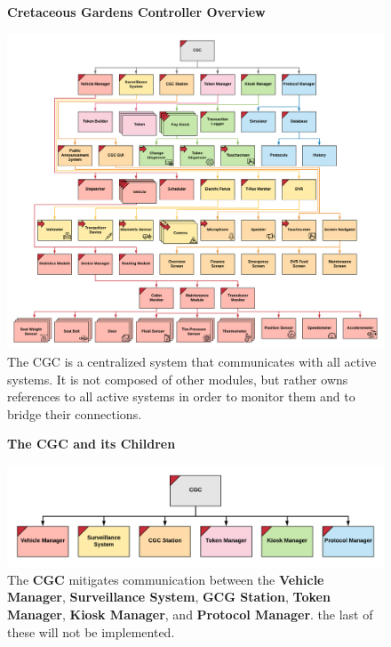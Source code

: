 \documentclass[12pt]{article}
\begin{document}
\begin{figure}[H]
    \centering
    \textbf{Cretaceous Gardens Controller Overview}\par
    \includegraphics[scale=0.173]{CGC-Design-Overview.png}
    \caption{The CGC is a centralized system that communicates with all active systems. 
    It is not composed of other modules, but rather owns references to all active systems in order to monitor 
    them and to bridge their connections.}
  \label{fig:CGCOverview}
\end{figure}    

\begin{figure}[H]
    \centering
    \textbf{The CGC and its Children}\par
    \includegraphics[scale=.23]{CGC-Top.png}
    \caption{The \textbf{CGC} mitigates communication between the \textbf{Vehicle Manager},
    \textbf{Surveillance System}, \textbf{GCG Station}, \textbf{Token Manager}, \textbf{Kiosk Manager}, and \textbf{Protocol Manager}.
    the last of these will not be implemented.}
    \label{fig:CGCTop}
\end{figure}
\end{document}
